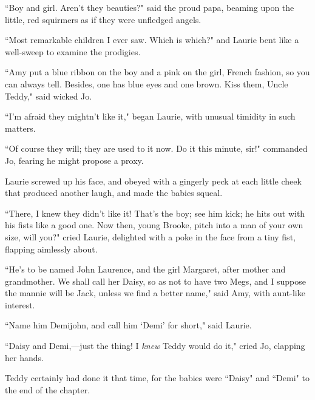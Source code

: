 ``Boy and girl. Aren't they beauties?" said the proud
papa, beaming upon the little, red squirmers as if they were unfledged
angels.

``Most remarkable children I ever saw. Which is which?" and Laurie bent
like a well-sweep to examine the prodigies.

``Amy put a blue ribbon on the boy and a pink on the girl, French
fashion, so you can always tell. Besides, one has blue eyes and one
brown. Kiss them, Uncle Teddy," said wicked Jo.

``I'm afraid they mightn't like it,"
began Laurie, with unusual timidity in such matters.

``Of course they will; they are used to it now. Do it this minute, sir!"
commanded Jo, fearing he might propose a proxy.

Laurie screwed up his face, and obeyed with a gingerly peck at each
little cheek that produced another laugh, and made the babies squeal.

``There, I knew they didn't like it!
That's the boy; see him kick; he hits out with his fists
like a good one. Now then, young Brooke, pitch into a man of your own
size, will you?" cried Laurie, delighted with a poke in the face from a
tiny fist, flapping aimlessly about.

``He's to be named John Laurence, and the girl Margaret,
after mother and grandmother. We shall call her Daisy, so as not to have
two Megs, and I suppose the mannie will be Jack, unless we find a better
name," said Amy, with aunt-like interest.

``Name him Demijohn, and call him `Demi'
for short," said Laurie.

``Daisy and Demi,---just the thing! I \emph{knew} Teddy would do it,"
cried Jo, clapping her hands.

Teddy certainly had done it that time, for the babies were ``Daisy" and
``Demi" to the end of the chapter.
